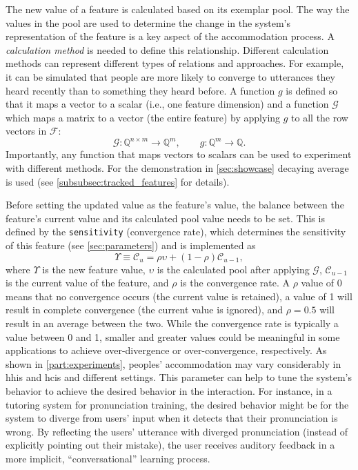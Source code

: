 The new value of a feature is calculated based on its exemplar pool.
The way the values in the pool are used to determine the change in the system's representation of the feature is a key aspect of the accommodation process.
A \emph{calculation method} is needed to define this relationship.
Different calculation methods can represent different types of relations and approaches.
For example, it can be simulated that people are more likely to converge to utterances they heard recently than to something they heard before.
A function $g$ is defined so that it maps a vector to a scalar (i.e., one feature dimension) and a function $\mathcal{G}$ which maps a matrix to a vector (the entire feature) by applying $g$ to all the row vectors in $\mathcal{F}$:
%
\begin{equation}
	\label{eq:matrix2vec}
	\mathcal{G}: \mathbb{Q}^{n \times m} \longrightarrow \mathbb{Q}^{m}, \qquad g: \mathbb{Q}^{m} \longrightarrow \mathbb{Q}.
\end{equation}
%
\noindent
Importantly, any function that maps vectors to scalars can be used to experiment with different methods.
For the demonstration in \cref{sec:showcase} decaying average is used (see \cref{subsubsec:tracked_features} for details).

Before setting the updated value as the feature's value, the balance between the feature's current value and its calculated pool value needs to be set.
This is defined by the \texttt{sensitivity} (convergence rate), which determines the sensitivity of this feature (see \cref{sec:parameters}) and is implemented as
%
\begin{equation}
	\Upsilon \equiv \mathcal{C}_u = \rho \upsilon + \left(1 - \rho \right) \mathcal{C}_{u-1},
	\label{eq:convergence_rate}
\end{equation}
\noindent
%
where $\Upsilon$ is the new feature value, $\upsilon$ is the calculated pool after applying $\mathcal{G}$, $\mathcal{C}_{u-1}$ is the current value of the feature, and $\rho$ is the convergence rate.
A $\rho$ value of 0 means that no convergence occurs (the current value is retained), a value of 1 will result in complete convergence (the current value is ignored), and $\rho=0.5$ will result in an average between the two.
While the convergence rate is typically a value between 0 and 1, smaller and greater values could be meaningful in some applications to achieve over-divergence or over-convergence, respectively.
As shown in \cref{part:experiments}, peoples' accommodation may vary considerably in \acp{hhi} and \acp{hci} and different settings.
This parameter can help to tune the system's behavior to achieve the desired behavior in the interaction.
For instance, in a tutoring system for pronunciation training, the desired behavior might be for the system to diverge from users' input when it detects that their pronunciation is wrong.
By reflecting the users' utterance with diverged pronunciation (instead of explicitly pointing out their mistake), the user receives auditory feedback in a more implicit, \enquote{conversational} learning process.

